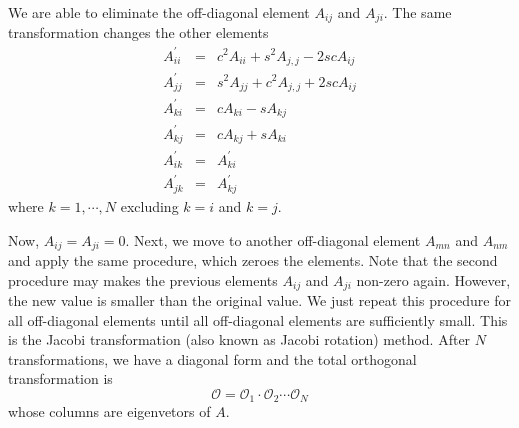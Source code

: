 {We are able to eliminate the off-diagonal element $A_{ij}$ and $A_{ji}$. The same transformation changes the other elements
\begin{subequations}
\begin{eqnarray}
A^\prime_{ii} &=& c^2 A_{ii} + s^2 A_{j,j} - 2 s c A_{ij} \\
A^\prime_{jj} &=& s^2 A_{jj} + c^2 A_{j,j} + 2 s c A_{ij} \\
A^\prime_{ki} &=& c A_{ki} - s A_{kj} \\
A^\prime_{kj} &=& c A_{kj} + s A_{ki} \\
A^\prime_{ik} &=& A^\prime_{ki}\\
A^\prime_{jk} &=& A^\prime_{kj}
\end{eqnarray}
\label{eq:jacobi_rot}
\end{subequations}
where $k=1, \cdots, N$ excluding $k=i$ and $k=j$.

Now, $A_{ij}=A_{ji}=0$.  Next, we move to another off-diagonal element $A_{mn}$ and $A_{nm}$ and apply the same procedure, which zeroes the elements. Note that the second procedure may makes the previous elements $A_{ij}$ and $A_{ji}$ non-zero again.  However, the new value is smaller than the original value. We just repeat this procedure for all off-diagonal elements until all off-diagonal elements are sufficiently small.   This is the Jacobi transformation (also known as Jacobi rotation) method.  After $N$ transformations, we have a diagonal form and the total orthogonal transformation is
\begin{equation}
\mathcal{O} = \mathcal{O}_1 \cdot \mathcal{O}_2 \cdots \mathcal{O}_N
\end{equation}
whose columns are eigenvetors of $A$.

}
